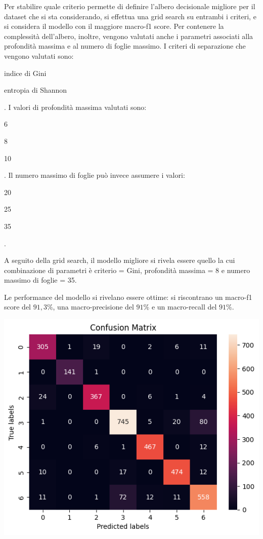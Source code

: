 Per stabilire quale criterio permette di definire l'albero decisionale
migliore per il dataset che si sta considerando, si effettua una grid search
su entrambi i criteri, e si considera il modello con il maggiore macro-f1 score.
Per contenere la complessità dell'albero, inoltre,
vengono valutati anche i parametri associati alla profondità massima
e al numero di foglie massimo.
I criteri di separazione che vengono valutati sono: \begin{itemize*}
    \item indice di Gini
    \item entropia di Shannon
\end{itemize*}.
I valori di profondità massima valutati sono: \begin{itemize*}
    \item 6
    \item 8
    \item 10
\end{itemize*}.
Il numero massimo di foglie può invece assumere i valori: \begin{itemize*}
    \item 20
    \item 25
    \item 35
\end{itemize*}.

A seguito della grid search, il modello migliore si rivela essere quello la cui
combinazione di parametri è criterio = Gini, profondità massima = 8 e numero massimo
di foglie = 35.

Le performance del modello si rivelano essere ottime: si riscontrano 
un macro-f1 score del $91,3\%$, una macro-precisione del $91\%$ e 
un macro-recall del $91\%$.

\begin{Figure}
    \centering
    \includegraphics[width=\linewidth]{img/tree_confusion_matrix.png}
\end{Figure}

